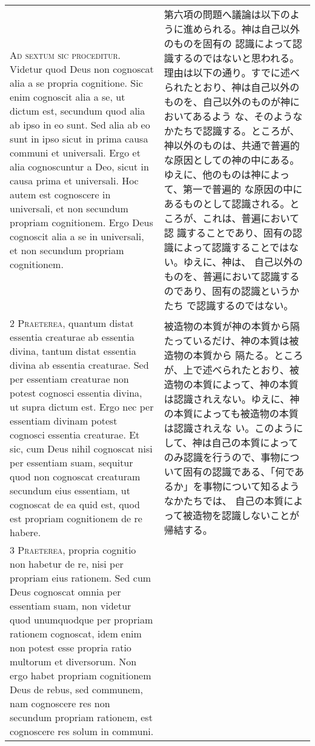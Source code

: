 \documentclass[10pt]{jsarticle} %
\begin{document}
\begin{longtable}{p{21em}p{21em}}
{\huge A}{\scshape d sextum sic proceditur}. Videtur quod Deus
non cognoscat alia a se propria cognitione. Sic enim cognoscit alia a
se, ut dictum est, secundum quod alia ab ipso in eo sunt. Sed alia ab eo
sunt in ipso sicut in prima causa communi et universali. Ergo et alia
cognoscuntur a Deo, sicut in causa prima et universali. Hoc autem est
cognoscere in universali, et non secundum propriam cognitionem. Ergo
Deus cognoscit alia a se in universali, et non secundum propriam
cognitionem.

&

第六項の問題へ議論は以下のように進められる。神は自己以外のものを固有の
認識によって認識するのではないと思われる。理由は以下の通り。すでに述べ
られたとおり、神は自己以外のものを、自己以外のものが神においてあるよう
な、そのようなかたちで認識する。ところが、神以外のものは、共通で普遍的
な原因としての神の中にある。ゆえに、他のものは神によって、第一で普遍的
な原因の中にあるものとして認識される。ところが、これは、普遍において認
識することであり、固有の認識によって認識することではない。ゆえに、神は、
自己以外のものを、普遍において認識するのであり、固有の認識というかたち
で認識するのではない。

\\


{\scshape 2 Praeterea}, quantum distat essentia
creaturae ab essentia divina, tantum distat essentia divina ab essentia
creaturae. Sed per essentiam creaturae non potest cognosci essentia
divina, ut supra dictum est. Ergo nec per essentiam divinam potest
cognosci essentia creaturae. Et sic, cum Deus nihil cognoscat nisi per
essentiam suam, sequitur quod non cognoscat creaturam secundum eius
essentiam, ut cognoscat de ea quid est, quod est propriam cognitionem de
re habere.


&

被造物の本質が神の本質から隔たっているだけ、神の本質は被造物の本質から
隔たる。ところが、上で述べられたとおり、被造物の本質によって、神の本質
は認識されえない。ゆえに、神の本質によっても被造物の本質は認識されえな
い。このようにして、神は自己の本質によってのみ認識を行うので、事物につ
いて固有の認識である、「何であるか」を事物について知るようなかたちでは、
自己の本質によって被造物を認識しないことが帰結する。

\\


{\scshape 3 Praeterea}, propria cognitio non habetur de
re, nisi per propriam eius rationem. Sed cum Deus cognoscat omnia per
essentiam suam, non videtur quod unumquodque per propriam rationem
cognoscat, idem enim non potest esse propria ratio multorum et
diversorum. Non ergo habet propriam cognitionem Deus de rebus, sed
communem, nam cognoscere res non secundum propriam rationem, est
cognoscere res solum in communi.


\end{longtable}
\end{document}

